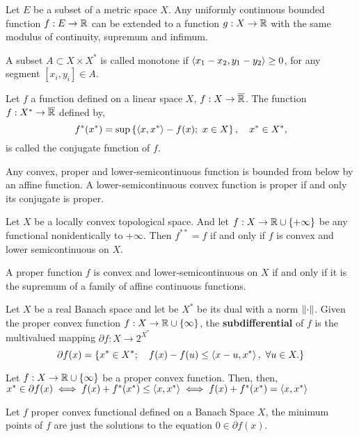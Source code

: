 \begin{theorem}
	Let $E$ be a subset of a metric space $X$. Any uniformly continuous bounded function $f:E\rightarrow\mathbb{R}$ can be extended to a function $g:X\rightarrow \mathbb{R}$ with the same modulus of continuity, supremum and infimum.
\end{theorem}

A subset $A\subset X\times X^*$ is called monotone if $\left\langle x_1-x_2, y_1-y_2 \right\rangle\geq 0$, for any segment $[x_i, y_i]\in A$.
\begin{definition}
	Let $f$ a function defined on a linear space $X$, $f:X\to\overline{\mathbb{R}}$. The function $f:X^*\to\overline{\mathbb{R}}$ defined by,
	\begin{equation}
		f^*(x^*)=\sup\braces{\anglesbox{x,x^*}-f(x);\ x\in X}, \quad x^*\in X^*,
	\end{equation} is called the conjugate function of $f$. 
\end{definition}

Any convex, proper and lower-semicontinuous function is bounded from below by an affine function. A lower-semicontinuous convex function is proper if and only its conjugate is proper. 
\begin{theorem}
Let $X$ be a locally convex topological space. And let $f:X\rightarrow \mathbb{R}\cup\left\lbrace +\infty \right\rbrace$ be any functional nonidentically to $+\infty$. Then $f^{**}=f$ if and only if $f$ is convex and lower semicontinuous on $X$.\label{thm: Convex Envelope Theorem}
\end{theorem}

A proper function $f$ is convex and lower-semicontinuous on $X$ if and only if it is the supremum of a family of affine continuous functions.

\begin{definition}[Subdifferential]
	Let $X$ be a real Banach space and let be $X^*$ be its dual with a norm $\left\|\cdot\right\|$. Given the proper convex function $f:X\rightarrow \mathbb{R}\cup\left\lbrace \infty \right\rbrace$, the \textbf{subdifferential} of $f$  is the multivalued mapping $\partial f:X\to2^{X^*}$
	\begin{equation*}
		\partial f(x)=\left\lbrace x^*\in X^*;\quad f(x)-f(u)\leq \left\langle x-u, x^* \right\rangle,\ \forall u \in X. \right\rbrace		
	\end{equation*}
\end{definition}

\begin{theorem}
	Let $f:X\to\mathbb{R}\cup\left\lbrace \infty \right\rbrace$ be a proper convex function. Then, then, $x^*\in\partial f(x)\iff f(x)+f^*(x^*)\leq\left\langle x, x^* \right\rangle\iff f(x)+f^*(x^*)=\left\langle x, x^* \right\rangle$
\end{theorem}
Let $f$ proper convex functional defined on a Banach Space $X$, the minimum points of $f$ are just the solutions to the equation  $0\in\partial f(x)$.

